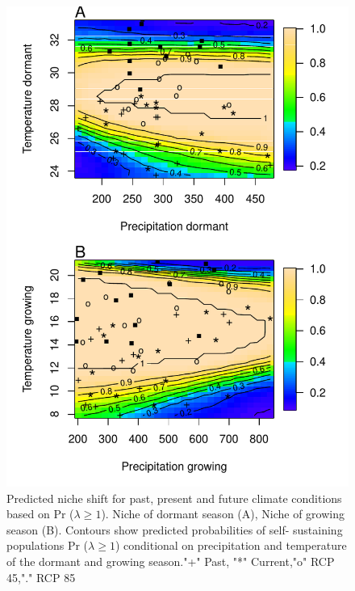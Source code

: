 \documentclass[12pt]{article}
\begin{document}
\begin{figure}%
  \begin{center}
    \includegraphics[width=0.78\linewidth]{Figures/niche.pdf}
  \caption{Predicted niche shift for past, present and future climate conditions based on Pr ($\lambda \geq 1$). Niche of dormant season (A), Niche of growing season (B). Contours show predicted probabilities of self- sustaining populations Pr ($\lambda \geq 1$) conditional on precipitation and temperature of the dormant and growing season."+" Past, "*" Current,"o" RCP 45,"." RCP 85}
  \label{fig:geoproj}
  \end{center}
\end{figure}
\end{document}
